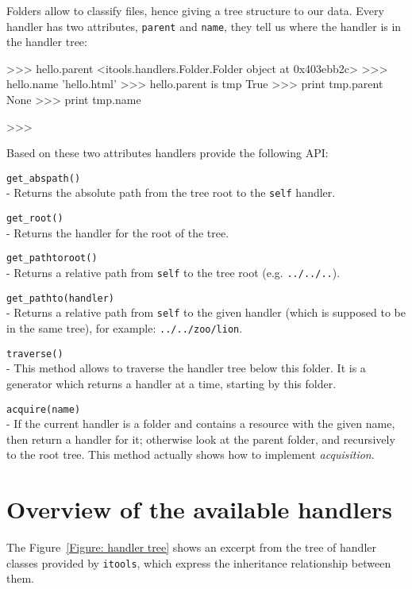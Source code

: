 Folders allow to classify files, hence giving a tree structure to our data.
Every handler has two attributes, {\tt parent} and {\tt name}, they tell us
where the handler is in the handler tree:

\begin{code}
    >>> hello.parent
    <itools.handlers.Folder.Folder object at 0x403ebb2c>
    >>> hello.name  
    'hello.html'
    >>> hello.parent is tmp
    True
    >>> print tmp.parent
    None
    >>> print tmp.name

    >>> 
\end{code}

Based on these two attributes handlers provide the following API:

\begin{api}
  {\tt get\_abspath()}\\
  - Returns the absolute path from the tree root to the {\tt self} handler.

  {\tt get\_root()}\\
  - Returns the handler for the root of the tree.

  {\tt get\_pathtoroot()}\\
  - Returns a relative path from {\tt self} to the tree root (e.g.
    {\tt ../../..}).

  {\tt get\_pathto(handler)}\\
  - Returns a relative path from {\tt self} to the given handler (which is
    supposed to be in the same tree), for example: {\tt ../../zoo/lion}.

  {\tt traverse()}\\
  - This method allows to traverse the handler tree below this folder. It
    is a generator which returns a handler at a time, starting by this
    folder.

  {\tt acquire(name)}\\
  - If the current handler is a folder and contains a resource with the given
    name, then return a handler for it; otherwise look at the parent folder,
    and recursively to the root tree. This method actually shows how to
    implement {\em acquisition}.
\end{api}



\section{Overview of the available handlers}

The Figure~\ref{Figure: handler tree} shows an excerpt from the tree of
handler classes provided by {\tt itools}, which express the inheritance
relationship between them.

